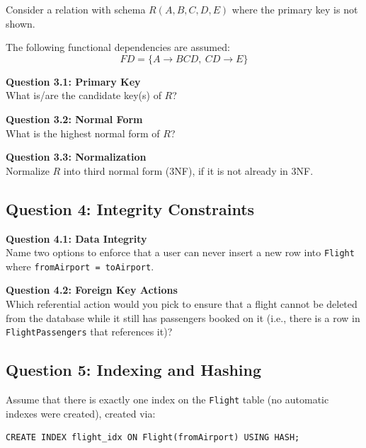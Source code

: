 \documentclass[12pt,a4paper]{article}
\begin{document}
Consider a relation with schema $R(A, B, C, D, E)$ where the primary key is not shown.

The following functional dependencies are assumed:
$$FD = \{A \rightarrow BCD,\ CD \rightarrow E\}$$

\textbf{Question 3.1: Primary Key}\\
What is/are the candidate key(s) of $R$?

\vspace{1cm}

\textbf{Question 3.2: Normal Form}\\
What is the highest normal form of $R$?

\vspace{1cm}

\textbf{Question 3.3: Normalization}\\
Normalize $R$ into third normal form (3NF), if it is not already in 3NF.

\vspace{1cm}

\subsection*{Question 4: Integrity Constraints}

\textbf{Question 4.1: Data Integrity}\\
Name two options to enforce that a user can never insert a new row into \texttt{Flight} where \texttt{fromAirport = toAirport}.

\vspace{1cm}

\textbf{Question 4.2: Foreign Key Actions}\\
Which referential action would you pick to ensure that a flight cannot be deleted from the database while it still has passengers booked on it (i.e., there is a row in \texttt{FlightPassengers} that references it)?

\vspace{1cm}

\subsection*{Question 5: Indexing and Hashing}

Assume that there is exactly one index on the \texttt{Flight} table (no automatic indexes were created), created via:

\begin{lstlisting}
CREATE INDEX flight_idx ON Flight(fromAirport) USING HASH;
\end{lstlisting}
\end{document}

